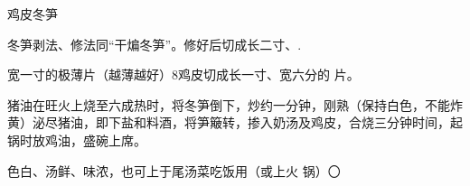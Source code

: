 \begin{recipe}{鸡皮冬笋}

\ingredients


\cooking

\step 冬笋剥法、修法同“干煸冬笋”。修好后切成长二寸、.

宽一寸的极薄片（越薄越好）8鸡皮切成长一寸、宽六分的 片。

\step 猪油在旺火上烧至六成热时，将冬笋倒下，炒约一分钟，刚熟（保持白色，不能炸黄）泌尽猪油，即下盐和料酒，将笋簸转，掺入奶汤及鸡皮，合烧三分钟时间，起锅时放鸡油，盛碗上席。

\notes

色白、汤鲜、味浓，也可上于尾汤菜吃饭用（或上火 锅）〇

\end{recipe}


